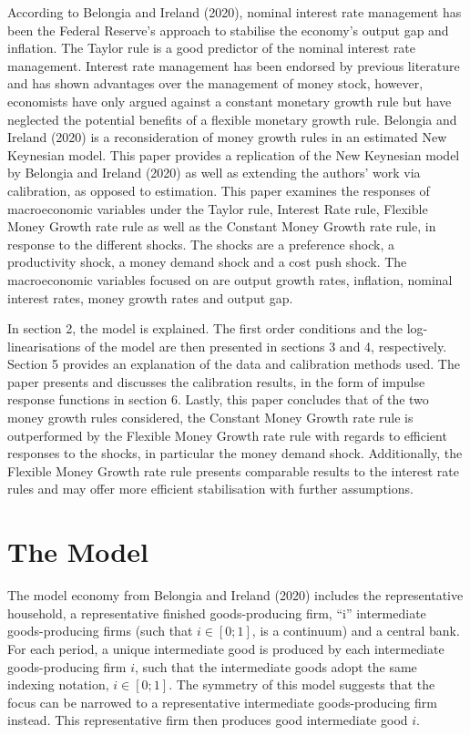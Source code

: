 \documentclass[11pt,preprint, authoryear]{elsarticle}
\numberwithin{equation}{section}
\numberwithin{figure}{section}
\numberwithin{table}{section}
\begin{document}
According to Belongia and Ireland (2020), nominal interest rate
management has been the Federal Reserve's approach to stabilise the
economy's output gap and inflation. The Taylor rule is a good predictor
of the nominal interest rate management. Interest rate management has
been endorsed by previous literature and has shown advantages over the
management of money stock, however, economists have only argued against
a constant monetary growth rule but have neglected the potential
benefits of a flexible monetary growth rule. Belongia and Ireland (2020)
is a reconsideration of money growth rules in an estimated New Keynesian
model. This paper provides a replication of the New Keynesian model by
Belongia and Ireland (2020) as well as extending the authors' work via
calibration, as opposed to estimation. This paper examines the responses
of macroeconomic variables under the Taylor rule, Interest Rate rule,
Flexible Money Growth rate rule as well as the Constant Money Growth
rate rule, in response to the different shocks. The shocks are a
preference shock, a productivity shock, a money demand shock and a cost
push shock. The macroeconomic variables focused on are output growth
rates, inflation, nominal interest rates, money growth rates and output
gap.

In section 2, the model is explained. The first order conditions and the
log-linearisations of the model are then presented in sections 3 and 4,
respectively. Section 5 provides an explanation of the data and
calibration methods used. The paper presents and discusses the
calibration results, in the form of impulse response functions in
section 6. Lastly, this paper concludes that of the two money growth
rules considered, the Constant Money Growth rate rule is outperformed by
the Flexible Money Growth rate rule with regards to efficient responses
to the shocks, in particular the money demand shock. Additionally, the
Flexible Money Growth rate rule presents comparable results to the
interest rate rules and may offer more efficient stabilisation with
further assumptions.

\hypertarget{the-model}{%
\section{The Model}\label{the-model}}

The model economy from Belongia and Ireland (2020) includes the
representative household, a representative finished goods-producing
firm, ``i'' intermediate goods-producing firms (such that
\(i \in [0; 1]\), is a continuum) and a central bank. For each period, a
unique intermediate good is produced by each intermediate
goods-producing firm \(i\), such that the intermediate goods adopt the
same indexing notation, \(i \in [0; 1]\). The symmetry of this model
suggests that the focus can be narrowed to a representative intermediate
goods-producing firm instead. This representative firm then produces
good intermediate good \(i\).
\end{document}
